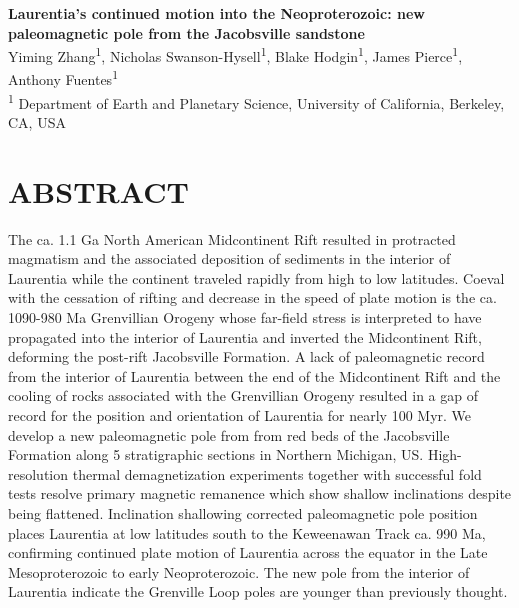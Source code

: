 \documentclass[11pt,letterpaper]{article}
\begin{document}
\begin{flushleft}

{\Large \textbf{Laurentia's continued motion into the Neoproterozoic: new paleomagnetic pole from the Jacobsville sandstone}}
\\
\singlespacing
 Yiming Zhang\textsuperscript{1}, Nicholas Swanson-Hysell\textsuperscript{1}, Blake Hodgin\textsuperscript{1}, James Pierce\textsuperscript{1}, Anthony Fuentes\textsuperscript{1}\\
\bigskip
\textsuperscript{1} Department of Earth and Planetary Science, University of California, Berkeley, CA, USA\\

\smallskip
\end{flushleft}


\section*{ABSTRACT}

The ca. 1.1 Ga North American Midcontinent Rift resulted in protracted magmatism and the associated deposition of sediments in the interior of Laurentia while the continent traveled rapidly from high to low latitudes. Coeval with the cessation of rifting and decrease in the speed of plate motion is the ca. 1090-980 Ma Grenvillian Orogeny whose far-field stress is interpreted to have propagated into the interior of Laurentia and inverted the Midcontinent Rift, deforming the post-rift Jacobsville Formation. A lack of paleomagnetic record from the interior of Laurentia between the end of the Midcontinent Rift and the cooling of rocks associated with the Grenvillian Orogeny resulted in a gap of record for the position and orientation of Laurentia for nearly 100 Myr. We develop a new paleomagnetic pole from from red beds of the Jacobsville Formation along 5 stratigraphic sections in Northern Michigan, US. High-resolution thermal demagnetization experiments together with successful fold tests resolve primary magnetic remanence which show shallow inclinations despite being  flattened. Inclination shallowing corrected paleomagnetic pole position places Laurentia at low latitudes south to the Keweenawan Track ca. 990 Ma, confirming continued plate motion of Laurentia across the equator in the Late Mesoproterozoic to early Neoproterozoic. The new pole from the interior of Laurentia indicate the Grenville Loop poles are younger than previously thought.
\end{document}
